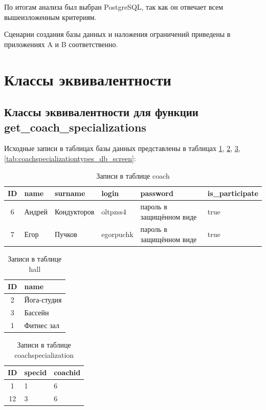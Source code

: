 По итогам анализа был выбран PostgreSQL, так как он отвечает всем вышеизложенным критериям.

Сценарии создания базы данных и наложения ограничений приведены в приложениях A и B соответственно.

\section{Классы эквивалентности}

\subsection{Классы эквивалентности для функции get\_coach\_specializations}

Исходные записи в таблицах базы данных представлены в таблицах \ref{tab:coach_db_screen},
\ref{tab:hall_db_screen}, \ref{tab:coachspecialization_db_screen}, \ref{tab:coachspecializationtypes_db_screen}:

\begin{table}[H]
	\centering
	\caption{Записи в таблице coach}
	\begin{tabular}{|c|p{2cm}|p{3cm}|p{2cm}|p{3.5cm}|p{3cm}|}
	\hline
	ID & name & surname & login & password & is\_participate \\
	\hline
	6 & Андрей & Кондукторов & oltpzss4 & пароль в защищённом виде & true \\
	\hline
	7 & Егор & Пучков & egorpuchk & пароль в защищённом виде & true \\
	\hline
	\end{tabular}
	\label{tab:coach_db_screen}
\end{table}

\begin{table}[H]
	\centering
	\caption{Записи в таблице hall}
	\begin{tabular}{|c|p{15cm}|}
	\hline
	ID & name \\
	\hline
	2 & Йога-студия \\
	\hline
	3 & Бассейн \\
	\hline
	1 & Фитнес зал \\
	\hline
	\end{tabular}
	\label{tab:hall_db_screen}
\end{table}

\begin{table}[H]
	\centering
	\caption{Записи в таблице coachspecialization}
	\begin{tabular}{|c|p{7.5cm}|p{7.5cm}|}
	\hline
	ID & specid & coachid \\
	\hline
	1 & 1 & 6 \\
	\hline
	12 & 3 & 6 \\
	\hline
	\end{tabular}
	\label{tab:coachspecialization_db_screen}
\end{table}

